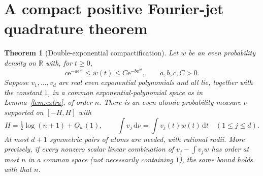 \documentclass[11pt]{article}
\newtheorem{theorem}{Theorem}[section]
\theoremstyle{remark}\newtheorem{remark}[theorem]{Remark}
\newcommand{\R}{\mathbb R}
\newcommand{\e}{\mathrm e}
\newcommand{\dd}{\,\mathrm d}
\begin{document}
\section{A compact positive Fourier-jet quadrature theorem}
\begin{theorem}[Double-exponential compactification]\label{thm:quad}
Let $w$ be an even probability density on $\R$ with, for $t\ge0$,
\begin{equation}\label{eq:env}
 c\e^{-a\e^{2t}}\le w(t)\le C\e^{-b\e^{2t}},\qquad a,b,c,C>0.
\end{equation}
Suppose $v_1,\ldots,v_d$ are real even exponential polynomials and all lie, together with the constant $1$, in a common exponential-polynomial space as in Lemma~\ref{lem:extra}, of order $n$. There is an even atomic probability measure $\nu$ supported on $[-H,H]$ with
\[
 H=\tfrac12\log(n+1)+O_w(1),\qquad
 \int v_j\dd\nu=\int v_j(t)w(t)\dd t\quad(1\le j\le d).
\]
At most $d+1$ symmetric pairs of atoms are needed, with rational radii. More precisely, if every nonzero scalar linear combination of $v_j-\int v_jw$ has order at most $n$ in a common space (not necessarily containing $1$), the same bound holds with that $n$.
\end{theorem}
\end{document}
